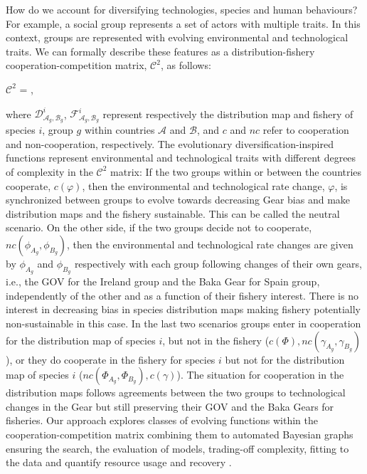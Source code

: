 \documentclass[12pt,a4paper]{article}
\begin{document}
{\begin{tcolorbox}[colback=green!5!white,colframe=green!75!black]
How do we account for diversifying technologies, species and human behaviours? For example, a social group represents a set of actors with multiple traits. In this context, groups are represented with evolving environmental and technological traits. We can formally describe these features as a distribution-fishery cooperation-competition matrix,
  $\mathcal{C}^{2}$, as follows:
  \vspace{-0.20 in}\\
\begin{center}
  $\mathcal{C}^2$ = , 
    \vspace{-0.05 in}
\end{center}
where $\mathcal{D}^{i}_{\mathcal{A}_{g},\mathcal{B}_{g}}$, $\mathcal{F}^{i}_{\mathcal{A}_{g},\mathcal{B}_{g}}$ represent respectively the distribution map and fishery of species $i$, group $g$ within countries $\mathcal{A}$ and $\mathcal{B}$, and $c$ and $nc$ refer to cooperation and non-cooperation, respectively. The evolutionary diversification-inspired functions represent environmental and technological traits with different degrees of complexity in the $\mathcal{C}^2$ matrix: If the two groups within or between the countries cooperate, $c(\varphi)$, then the environmental and technological rate change, $\varphi$, is synchronized between groups to evolve towards decreasing Gear bias and make distribution maps and the fishery sustainable. This can be called the neutral scenario. On the other side, if the two groups decide not to cooperate, $nc(\phi_{A_{g}},\phi_{B_{g}})$, then the environmental and technological rate changes are given by $\phi_{A_{g}}$ and
$\phi_{B_{g}}$ respectively with each group following changes of their own gears, i.e., the GOV for the Ireland group and the Baka Gear for Spain group,
independently of the other and as a function of their fishery interest. There is no interest in decreasing bias in species distribution maps making fishery potentially non-sustainable in this case. In the last two scenarios groups enter in cooperation for the distribution
map of species $i$, but not in the fishery ($c(\Phi), nc(\gamma_{A_{g}},\gamma_{B_{g}})$), or they do cooperate in the fishery for species $i$ but not for the distribution map of species $i$ ($nc(\Phi_{A_{g}},\Phi_{B_{g}}), c(\gamma)$). The situation for cooperation in the distribution maps follows agreements between the two groups to technological changes in the Gear but still preserving their GOV and the Baka Gears for fisheries. Our approach explores classes of evolving functions within the cooperation-competition matrix combining them to automated Bayesian graphs ensuring the search, the evaluation of models, trading-off complexity, fitting to the data and quantify resource usage and recovery \citep{Guimera2020,Steinruecken}.

\end{tcolorbox}}
\end{document}
